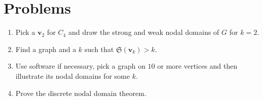 \documentclass{article}
\newcommand{\bv}{\mathbf{v}}
\theoremstyle{definition}
\begin{document}
\section*{Problems}
\begin{enumerate}
\setlength\itemsep{2em}
\item Pick a $\bv_2$ for $C_4$ and draw the strong and weak nodal domains of $G$ for $k = 2$.
\item Find a graph and a $k$ such that $\mathfrak{S}(\bv_k) > k$.  
\item Use software if necessary, pick a graph on $10$ or more vertices and then illustrate its nodal domains for some $k$.
\item Prove the discrete nodal domain theorem.  
\end{enumerate}

\end{document}
